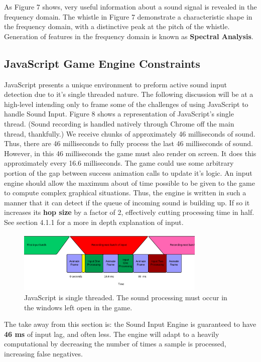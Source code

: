 \documentclass[DIV=calc, paper=a4, fontsize=11pt, twocolumn]{scrartcl}   %
\begin{document}
  \par As Figure 7 shows, very useful information about a sound signal is revealed in the frequency domain. The whistle in Figure 7 demonstrate a characteristic shape in the frequency domain, with a distinctive peak at the pitch of the whistle. Generation of features in the frequency domain is known as \textbf{Spectral Analysis}.

\subsection{JavaScript Game Engine Constraints}
JavaScript presents a unique environment to preform active sound input detection due to it's single threaded nature. The following discussion will be at a high-level intending only to frame some of the challenges of using JavaScript to handle Sound Input. Figure 8 shows a representation of JavaScript's single thread. (Sound recording is handled natively through Chrome off the main thread, thankfully.) We receive chunks of approximately 46 milliseconds of sound. Thus, there are 46 milliseconds to fully process the last 46 milliseconds of sound. However, in this 46 milliseconds the game must also render on screen. It does this approximately every 16.6 milliseconds. The game could use some arbitrary portion of the gap between success animation calls to update it's logic. An input engine should allow the maximum about of time possible to be given to the game to compute complex graphical situations. Thus, the engine is written in such a manner that it can detect if the queue of incoming sound is building up. If so it increases its \textbf{hop size} by a factor of 2, effectively cutting processing time in half. See section 4.1.1 for a more in depth explanation of input.
\begin{figure}[h]
\centering
\includegraphics[width=90mm]{figures/JavascriptEventLoop.png}
\caption{JavaScript is single threaded. The sound processing must occur in the windows left open in the game.}
\label{overflow}
\end{figure}

\par The take away from this section is: the Sound Input Engine is guaranteed to  have \textbf{46 ms} of input lag, and often less. The engine will adapt to a heavily computational by decreasing the number of times a sample is processed, increasing false negatives.
\end{document}
